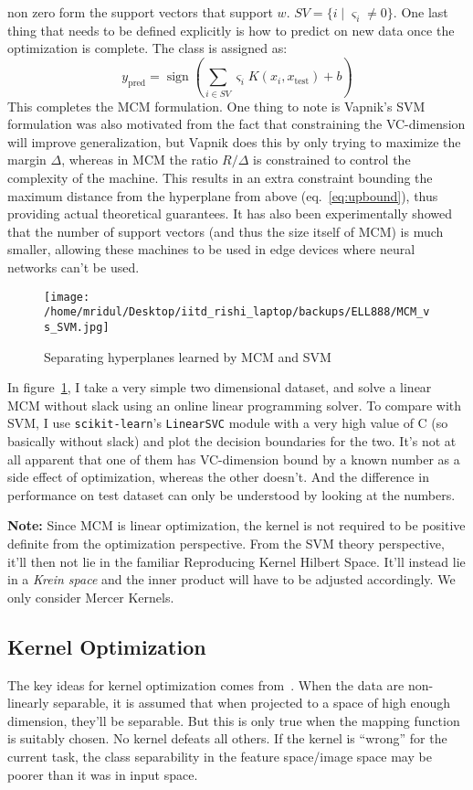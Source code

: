 \documentclass[11pt]{article}
\begin{document}
non zero form the support vectors that support $w$.
$SV=\{i\;\lvert\;\varsigma_i\ne 0\}$. One last
thing that needs to be defined explicitly is how to predict on new data once the
optimization is complete. The class is assigned as:
\[y_{\text{pred}}=\operatorname{sign}\left(\sum_{i\in
SV}\varsigma_iK(x_i,x_{\text{test}})+b\right)\]
This completes the MCM formulation. One thing to note is Vapnik's SVM
formulation was also motivated from the fact that constraining the VC\nobreakdash-dimension
will improve generalization, but Vapnik does this by only trying to maximize the
margin $\Delta$, whereas in MCM the ratio $R/\Delta$ is constrained to control the
complexity of the machine. This results in an extra constraint bounding the
maximum distance from the hyperplane from above (eq.~\ref{eq:upbound}), thus
providing actual theoretical guarantees. It has also been experimentally showed
that the number of support vectors (and thus the size itself of MCM) is much
smaller, allowing these machines to be used in edge devices where neural
networks can't be used.
\begin{figure}
    \centering
    \texttt{[image: /home/mridul/Desktop/iitd\_rishi\_laptop/backups/ELL888/MCM\_vs\_SVM.jpg]}
    \caption{\label{fig:mcmvsvm}Separating hyperplanes learned by MCM and SVM}
\end{figure}
In figure~\ref{fig:mcmvsvm}, I take a very simple two dimensional dataset, and
solve a linear MCM without slack using an online linear programming solver. To compare with SVM, I
use \texttt{scikit-learn}'s \texttt{LinearSVC} module with a very high value of
C (so basically without slack) and plot the decision boundaries for the two.
It's not at all apparent that one of them has VC\nobreakdash-dimension bound by a known
number as a side effect of optimization, whereas the other doesn't. And the
difference in performance on test dataset can only be understood by looking at
the numbers.\par
{\bf Note:} Since MCM is linear optimization, the kernel is not required to be
positive definite from the optimization perspective. From the SVM theory
perspective, it'll then not lie in the familiar Reproducing Kernel Hilbert
Space. It'll instead lie in a {\em Krein space} and the inner product will have
to be adjusted accordingly. We only consider Mercer Kernels.
\afterpage{\clearpage}
\subsection{Kernel Optimization}
The key ideas for kernel optimization comes from~\cite{amari}. When the data are
non\nobreakdash-linearly separable, it is assumed that when projected to a space of high
enough dimension, they'll be separable. But this is only true when the
mapping function is suitably chosen. No kernel defeats all
others. If the kernel is ``wrong'' for the current task, the class separability
in the feature space/image space may be poorer than it was in input space.
\end{document}
